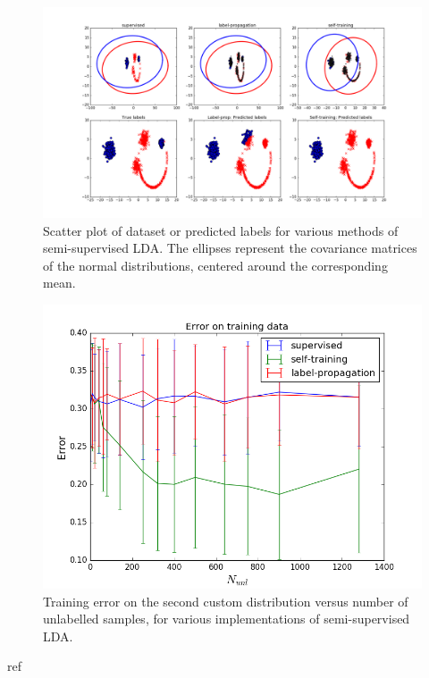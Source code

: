 \documentclass [a4paper] {report}
\begin{document}
	\begin{figure}[H]
		\begin{center}
			\includegraphics[scale=0.3]{Images/custom2.png}
			\caption{Scatter plot of dataset or predicted labels for various methods of semi-supervised LDA. The ellipses represent the covariance matrices of the normal distributions, centered around the corresponding mean.}
			\label{custom_2_dist}
		\end{center}
	\end{figure}	
	
	\begin{figure}[H]
		\begin{center}
			\includegraphics[scale=0.3]{Images/custom_2_train_error.png}
			\caption{Training error on the second custom distribution versus number of unlabelled samples, for various implementations of semi-supervised LDA.}
			\label{custom_2}
		\end{center}
	\end{figure}
	 
	
	\begin{bibliography}{ref}
		
	\end{bibliography}
\end{document}
